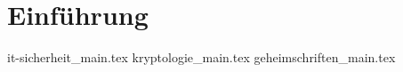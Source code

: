 
\part{Einführung}
\label{part-einfuehrung}

{it-sicherheit_main.tex}
{kryptologie_main.tex}
{geheimschriften_main.tex}